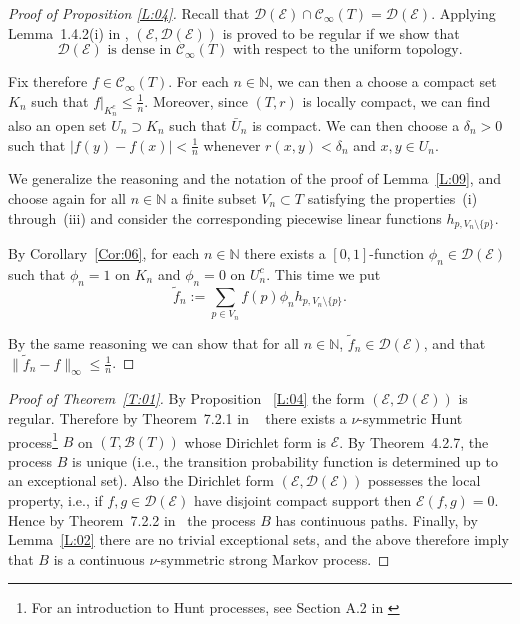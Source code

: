 \documentclass[11pt]{amsart}
\numberwithin{equation}{section}
\begin{document}
{{\begin{proof}[Proof of Proposition \ref{L:04}] Recall that ${\mathcal D}({\mathcal E})\cap {\mathcal C}_\infty(T)={\mathcal D}({\mathcal E})$. Applying Lemma~1.4.2(i) in  \cite{FukushimaOshimaTakeda1994}, $({\mathcal E}, {\mathcal D}({\mathcal E}))$ is proved to be regular if we show that
\begin{equation} \label{inreg}
{\mathcal D}({\mathcal E}) \mbox{ is dense in } {\mathcal C}_\infty(T) \mbox{ with respect to the uniform topology.}
\end{equation}

Fix therefore $f\in {\mathcal C}_\infty(T)$. For each $n \in {{\mathbb N}}$, we can then a choose a compact set $K_n$ such that $f\big|_{K_{n}^{c}}\le\tfrac1n$.
Moreover, since $(T,r)$ is locally compact, we can find also an open set $U_n\supset K_n$ such that $\bar{U}_{n}$ is compact. We can then choose
a  $\delta_n>0$ such that $|f(y)-f(x)|<\tfrac{1}{n}$ whenever $r(x,y)<\delta_n$ and $x,y\in U_n$.

We generalize the reasoning and the notation of the proof of Lemma~\ref{L:09}, and choose again for all $n\in{{\mathbb N}}$ a finite subset $V_{n} \subset T$ satisfying the properties~(i) through~(iii) and consider the corresponding piecewise linear functions $h_{p,V_n\setminus\{p\}}$.

 By Corollary~\ref{Cor:06}, for each $n\in\mathbb{N}$ there exists a $[0,1]$-function $\phi_{n}\in \mathcal{D}({\mathcal E})$ such that $\phi_{n}=1 $ on $K_{n}$ and $\phi_{n}  =0$ on $U_{n}^{c}$. This time we put
\begin{equation}
\label{e:tildefn}
   \tilde{f}_n
 :=
   \sum_{p\in V_n}f(p) \phi_{n}{h}_{p,V_n\setminus\{p\}}.
\end{equation}

By the same reasoning we can show that for all $n\in{{\mathbb N}}$, $\tilde{f}_n\in{\mathcal D}(\mathcal E)$, and that
$\|\tilde{f}_n-f\|_\infty\le\tfrac{1}{n}$.
\end{proof}{\smallskip}}

\begin{proof}[Proof of Theorem~\ref{T:01}]
By Proposition ~\ref{L:04} the form $({\mathcal E}, {\mathcal D}({\mathcal E}))$ is regular. Therefore  by  Theorem~7.2.1 in ~\cite{FukushimaOshimaTakeda1994} there exists a $\nu$-symmetric Hunt process\footnote{For an introduction to Hunt processes, see Section A.2 in \cite{FukushimaOshimaTakeda1994}} $B$ on $(T, {\mathcal B}(T))$ whose Dirichlet form is ${\mathcal E}$.
By Theorem~4.2.7, the process $B$ is unique (i.e., the transition probability function is determined up to an exceptional set).  Also the Dirichlet form
$({\mathcal E},{\mathcal D}({\mathcal E}))$
possesses the {{\it} local property}, i.e., if
$f,g\in{\mathcal D}({\mathcal E})$ have disjoint compact
support then ${\mathcal E}(f,g)=0$. Hence by Theorem~7.2.2 in~\cite{FukushimaOshimaTakeda1994} the process $B$ has  continuous paths.
{Finally, by Lemma~\ref{L:02} there are no trivial exceptional sets, and
the above therefore imply that $B$ is a continuous $\nu$-symmetric strong Markov process.}
\end{proof}{\smallskip}

}
\end{document}
